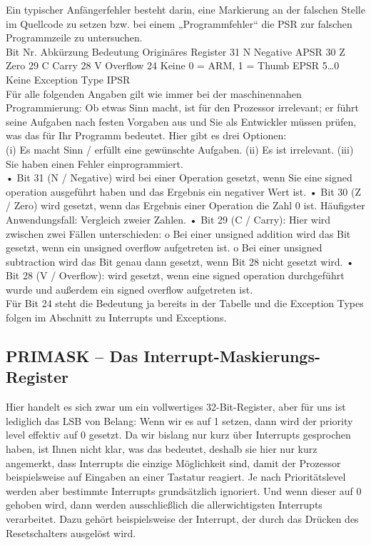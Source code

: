 Ein typischer Anfängerfehler besteht darin, eine Markierung an der falschen Stelle im Quellcode zu setzen bzw. bei einem „Programmfehler“ die PSR zur falschen Programmzeile zu untersuchen.\\

Bit Nr.	Abkürzung	Bedeutung	Originäres Register
31	N	Negative	APSR
30	Z	Zero	
29	C	Carry	
28	V	Overflow	
24	Keine	0 = ARM, 1 = Thumb	EPSR
5…0	Keine	Exception Type	IPSR\\


Für alle folgenden Angaben gilt wie immer bei der maschinennahen Programmierung: Ob etwas Sinn macht, ist für den Prozessor irrelevant; er führt seine Aufgaben nach festen Vorgaben aus und Sie als Entwickler müssen prüfen, was das für Ihr Programm bedeutet. Hier gibt es drei Optionen: \\

(i) Es macht Sinn / erfüllt eine gewünschte Aufgaben.
(ii) Es ist irrelevant.
(iii) Sie haben einen Fehler einprogrammiert.\\

•	Bit 31 (N / Negative) wird bei einer Operation gesetzt, wenn Sie eine signed operation ausgeführt haben und das Ergebnis ein negativer Wert ist.
•	Bit 30 (Z / Zero) wird gesetzt, wenn das Ergebnis einer Operation die Zahl 0 ist. Häufigster Anwendungsfall: Vergleich zweier Zahlen.
•	Bit 29 (C / Carry): Hier wird zwischen zwei Fällen unterschieden:
o	Bei einer unsigned addition wird das Bit gesetzt, wenn ein unsigned overflow aufgetreten ist.
o	Bei einer unsigned subtraction wird das Bit genau dann gesetzt, wenn Bit 28 nicht gesetzt wird.
•	Bit 28 (V / Overflow): wird gesetzt, wenn eine signed operation durchgeführt wurde und außerdem ein signed overflow aufgetreten ist.\\

Für Bit 24 steht die Bedeutung ja bereits in der Tabelle und die Exception Types folgen im Abschnitt zu Interrupts und Exceptions.

\subsection{PRIMASK – Das Interrupt-Maskierungs-Register}

Hier handelt es sich zwar um ein vollwertiges 32-Bit-Register, aber für uns ist lediglich das LSB von Belang: Wenn wir es auf 1 setzen, dann wird der priority level effektiv auf 0 gesetzt. Da wir bislang nur kurz über Interrupts gesprochen haben, ist Ihnen nicht klar, was das bedeutet, deshalb sie hier nur kurz angemerkt, dass Interrupts die einzige Möglichkeit sind, damit der Prozessor beispielsweise auf Eingaben an einer Tastatur reagiert. Je nach Prioritätslevel werden aber bestimmte Interrupts grundsätzlich ignoriert. Und wenn dieser auf 0 gehoben wird, dann werden ausschließlich die allerwichtigsten Interrupts verarbeitet. Dazu gehört beispielsweise der Interrupt, der durch das Drücken des Resetschalters ausgelöst wird.

